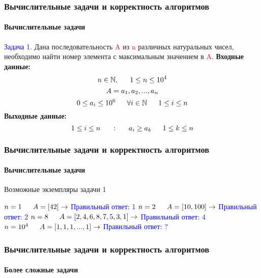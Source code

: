 \documentclass[aspectratio=169]{beamer}
\begin{document}
\begin{frame}
\frametitle{Вычислительные задачи и корректность алгоритмов}
\framesubtitle{Вычислительные задачи}
\justifying
\small
\textcolor{blue}{Задача 1}.  Дана последовательность \textcolor{red}{A} из \textcolor{red}{n} различных натуральных чисел, необходимо найти номер элемента с максимальным значением в \textcolor{red}{A}.\newline\newline
\textbf{Входные данные:}
$$\LARGE n \in \mathbb{N}, \quad 1 \leq n \leq 10^{4}$$
$$\LARGE A = a_{1}, a_{2}, ... , a_{n}$$
$$\LARGE 0\leq a_i \leq 10^{6} \quad \forall i \in \mathbb{N} \quad 1 \leq i \leq n$$\newline
\textbf{Выходные данные:}
$$\LARGE 1 \leq i \leq n \quad : \quad a_{i} \geq a_{k} \quad 1 \leq k \leq n $$
\end{frame}

\begin{frame}
\frametitle{Вычислительные задачи и корректность алгоритмов}
\framesubtitle{Вычислительные задачи}
\justifying
\small
Возможные экземпляры задачи 1\newline

$\LARGE n = 1 \quad  A = [42] \rightarrow$ \textcolor{blue}{Правильный ответ: 1}\newline\newline
$\LARGE n = 2 \quad  A = [10, 100] \rightarrow$ \textcolor{blue}{Правильный ответ: 2}\newline\newline
$\LARGE n = 8 \quad  A = [2, 4, 6, 8, 7, 5, 3, 1] \rightarrow$ \textcolor{blue}{Правильный ответ: 4}\newline\newline
$\LARGE n = 10^{4} \quad A = [1, 1, 1, ..., 1] \rightarrow$ \textcolor{blue}{Правильный ответ: ?}\newline\newline
\end{frame}

\begin{frame}
\frametitle{Вычислительные задачи и корректность алгоритмов}
\framesubtitle{Более сложные задачи}
\justifying
\small

\begin{figure}
    \captionsetup[subfigure]{labelformat=empty}
    \centering
     \quad\quad
\end{figure}
\end{frame}
\end{document}
